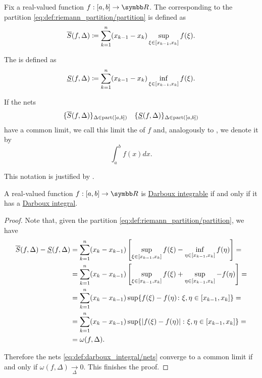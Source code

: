 \begin{definition}\label{def:darboux_integral}
  Fix a real-valued function \( f: [a, b] \to \BR \). The  corresponding to the partition \eqref{eq:def:riemann_partition/partition} is defined as
  \begin{equation*}
    \overline{S}(f, \Delta) \coloneqq \sum_{k=1}^n (x_{k-1} - x_k) \sup_{\xi \in [x_{k-1}, x_k]} f(\xi).
  \end{equation*}

  The  is defined as
  \begin{equation*}
    \underline{S}(f, \Delta) \coloneqq \sum_{k=1}^n (x_{k-1} - x_k) \inf_{\xi \in [x_{k-1}, x_k]} f(\xi).
  \end{equation*}

  If the nets
  \begin{align}\label{eq:def:darboux_integral/nets}
    \{ \overline{S}(f, \Delta) \}_{\Delta \in \operatorname{part}([a, b])}
    &&
    \{ \underline{S}(f, \Delta) \}_{\Delta \in \operatorname{part}([a, b])}
  \end{align}
  have a common limit, we call this limit the  of \( f \) and, analogously to , we denote it by
  \begin{equation*}
    \int_a^b f(x) dx.
  \end{equation*}

  This notation is justified by .
\end{definition}

\begin{proposition}\label{thm:darboux_integrable_iff_has_darboux_integral}
  A real-valued function \( f: [a, b] \to \BR \) is \hyperref[def:darboux_integrability]{Darboux integrable} if and only if it has a \hyperref[def:darboux_integral]{Darboux integral}.
\end{proposition}
\begin{proof}
  Note that, given the partition \eqref{eq:def:riemann_partition/partition}, we have
  \begin{align*}
    \overline{S}(f, \Delta) - \underline{S}(f, \Delta)
    &=
    \sum_{k=1}^n (x_k - x_{k-1}) \left[ \sup_{\xi \in [x_{k-1}, x_k]} f(\xi) - \inf_{\eta \in [x_{k-1}, x_k]} f(\eta) \right]
    = \\ &=
    \sum_{k=1}^n (x_k - x_{k-1}) \left[ \sup_{\xi \in [x_{k-1}, x_k]} f(\xi) + \sup_{\eta \in [x_{k-1}, x_k]} -f(\eta) \right]
    = \\ &=
    \sum_{k=1}^n (x_k - x_{k-1}) \sup \{ f(\xi) - f(\eta) \colon \xi, \eta \in [x_{k-1}, x_k] \}
    = \\ &=
    \sum_{k=1}^n (x_k - x_{k-1}) \sup \{ \left\vert f(\xi) - f(\eta) \right\vert \colon \xi, \eta \in [x_{k-1}, x_k] \}
    = \\ &=
    \omega(f, \Delta).
  \end{align*}

  Therefore the nets \eqref{eq:def:darboux_integral/nets} converge to a common limit if and only if \( \omega(f, \Delta) \xrightarrow[\Delta]{} 0 \). This finishes the proof.
\end{proof}

